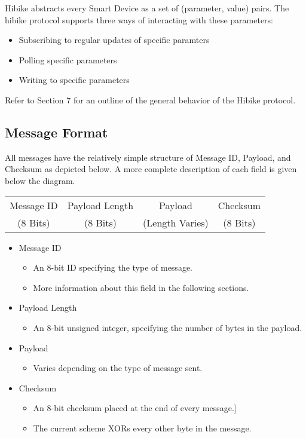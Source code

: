 \documentclass[12pt]{book}
\begin{document}
Hibike abstracts every Smart Device as a set of (parameter, value) pairs.
The hibike protocol supports three ways of interacting with these parameters:
\begin{itemize}
\item Subscribing to regular updates of specific paramters
\item Polling specific parameters
\item Writing to specific parameters
\end{itemize}

Refer to Section 7 for an outline of the general behavior of the Hibike protocol.

\subsection{Message Format}

All messages have the relatively simple structure of Message ID, Payload, and Checksum as
depicted below. A more complete description of each field is given below the diagram.

\begin{center}
	\begin{tabular}{|c|c|c|c|}
	\hline
	Message ID & Payload Length & Payload & Checksum \\
	(8 Bits) & (8 Bits) & (Length Varies) & (8 Bits) \\
	\hline
	\end{tabular}
\end{center}

\begin{itemize}
	\item Message ID
	\begin{itemize}
		\item An 8-bit ID specifying the type of message.
		\item More information about this field in the following sections.
	\end{itemize}
	\item Payload Length
	\begin{itemize}
		\item An 8-bit unsigned integer, specifying the number of bytes in the payload.
	\end{itemize}
	\item Payload
	\begin{itemize}
		\item Varies depending on the type of message sent.
	\end{itemize}
	\item Checksum
	\begin{itemize}
		\item An 8-bit checksum placed at the end of every message.]
		\item The current scheme XORs every other byte in the message.
	\end{itemize}
\end{itemize}
\end{document}
